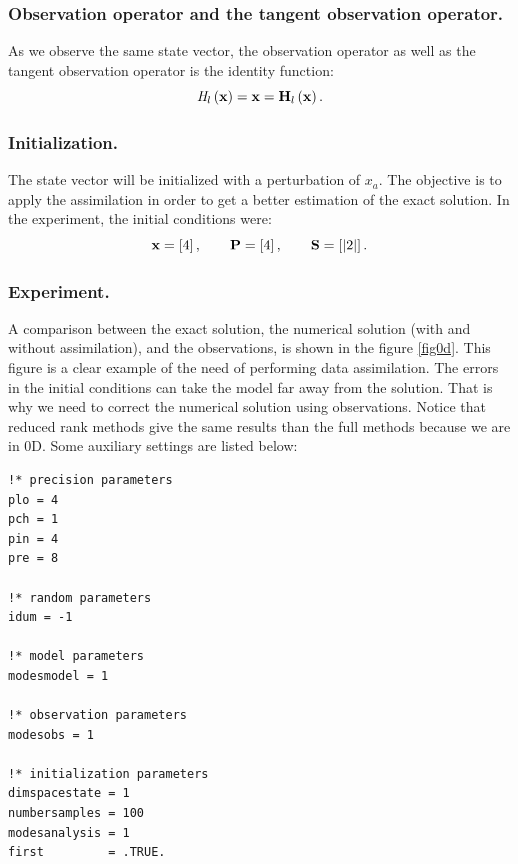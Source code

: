 \documentclass[12pt]{article}
\begin{document}
\subsubsection{Observation operator and the tangent observation operator.}
As we observe the same state vector, the observation operator as well as the tangent observation operator is the identity function:
\begin{equation}
{\it H}_l \left( {\bf x} \right) = {\bf x} = {\bf H}_l \left( {\bf x} \right).
\end{equation}

\subsubsection{Initialization.}
The state vector will be initialized with a perturbation of $x_a$. The objective is to apply the assimilation in order to get a better estimation of the exact solution. In the experiment, the initial conditions were: 
\begin{equation}
{\bf x} = \left[ 4 \right], \qquad {\bf P} = \left[ 4 \right], \qquad {\bf S} = \left[ \left| 2 \right| \right].
\end{equation}

\subsubsection{Experiment.}
A comparison between the exact solution, the numerical solution (with and without assimilation), and the observations, is shown in the figure \ref{fig0d}. This figure is a clear example of the need of performing data assimilation. The errors in the initial conditions can take the model far away from the solution. That is why we need to correct the numerical solution using observations. Notice that reduced rank methods give the same results than the full methods because we are in 0D. Some auxiliary settings are listed below:
\begin{verbatim}
!* precision parameters	
plo = 4
pch = 1
pin = 4
pre = 8

!* random parameters
idum = -1

!* model parameters
modesmodel = 1

!* observation parameters
modesobs = 1

!* initialization parameters
dimspacestate = 1
numbersamples = 100
modesanalysis = 1
first         = .TRUE.
\end{verbatim}
\end{document}
